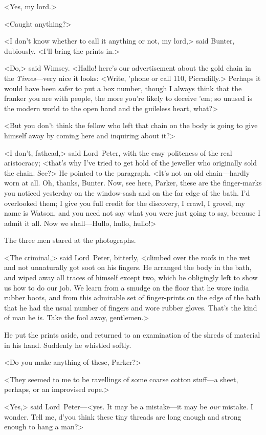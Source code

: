 <Yes, my lord.>

<Caught anything?>

<I don't know whether to call it anything or not, my lord,> said Bunter, dubiously. <I'll bring the prints in.>

<Do,> said Wimsey. <Hallo! here's our advertisement about the gold chain in the \textit{Times}—very nice it looks: <Write, 'phone or call 110, Piccadilly.> Perhaps it would have been safer to put a box number, though I always think that the franker you are with people, the more you're likely to deceive 'em; so unused is the modern world to the open hand and the guileless heart, what?>

<But you don't think the fellow who left that chain on the body is going to give himself away by coming here and inquiring about it?>

<I don't, fathead,> said Lord~Peter, with the easy politeness of the real aristocracy; <that's why I've tried to get hold of the jeweller who originally sold the chain. See?> He pointed to the paragraph. <It's not an old chain—hardly worn at all. Oh, thanks, Bunter. Now, see here, Parker, these are the finger-marks you noticed yesterday on the window-sash and on the far edge of the bath. I'd overlooked them; I give you full credit for the discovery, I crawl, I grovel, my name is Watson, and you need not say what you were just going to say, because I admit it all. Now we shall—Hullo, hullo, hullo!>

The three men stared at the photographs.

<The criminal,> said Lord~Peter, bitterly, <climbed over the roofs in the wet and not unnaturally got soot on his fingers. He arranged the body in the bath, and wiped away all traces of himself except two, which he obligingly left to show us how to do our job. We learn from a smudge on the floor that he wore india rubber boots, and from this admirable set of finger-prints on the edge of the bath that he had the usual number of fingers and wore rubber gloves. That's the kind of man he is. Take the fool away, gentlemen.>

He put the prints aside, and returned to an examination of the shreds of material in his hand. Suddenly he whistled softly.

<Do you make anything of these, Parker?>

<They seemed to me to be ravellings of some coarse cotton stuff—a sheet, perhaps, or an improvised rope.>

<Yes,> said Lord~Peter—<yes. It may be a mistake—it may be \textit{our} mistake. I wonder. Tell me, d'you think these tiny threads are long enough and strong enough to hang a man?>

